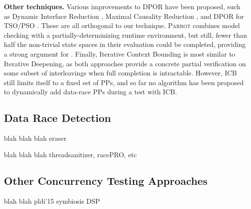{\bf Other techniques.} Various improvements to DPOR have been proposed, such as Dynamic Interface Reduction \cite{demeter}, Maximal Causality Reduction \cite{mcr}, and DPOR for TSO/PSO \cite{tsopso}.
These are all orthogonal to our technique.
\textsc{Parrot} \cite{parrot} combines model checking with a partially-determinizing runtime environment, but still, fewer than half the non-trivial state spaces in their evaluation could be completed, providing a strong argument for \quicksand.
Finally, Iterative Context Bounding \cite{chess} is most similar to Iterative Deepening, as both approaches provide a concrete partial verification on some subset of interleavings when full completion is intractable.
However, ICB still limits itself to a fixed set of PPs, and so far no algorithm has been proposed to dynamically add data-race PPs during a test with ICB.

\subsection{Data Race Detection}

blah blah blah eraser

blah blah blah threadsanitizer, racePRO, etc

\subsection{Other Concurrency Testing Approaches} %

blah blah pldi'15 symbiosis DSP





